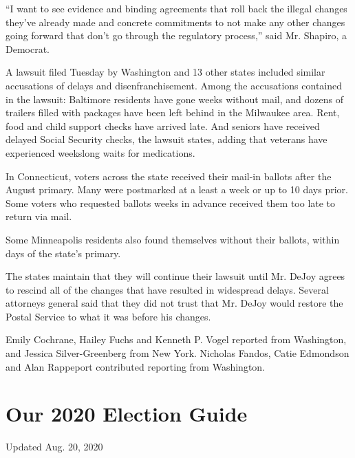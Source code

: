 ``I want to see evidence and binding agreements that roll back the
illegal changes they've already made and concrete commitments to not
make any other changes going forward that don't go through the
regulatory process,'' said Mr. Shapiro, a Democrat.

A lawsuit filed Tuesday by Washington and 13 other states included
similar accusations of delays and disenfranchisement. Among the
accusations contained in the lawsuit: Baltimore residents have gone
weeks without mail, and dozens of trailers filled with packages have
been left behind in the Milwaukee area. Rent, food and child support
checks have arrived late. And seniors have received delayed Social
Security checks, the lawsuit states, adding that veterans have
experienced weekslong waits for medications.

In Connecticut, voters across the state received their mail-in ballots
after the August primary. Many were postmarked at a least a week or up
to 10 days prior. Some voters who requested ballots weeks in advance
received them too late to return via mail.

Some Minneapolis residents also found themselves without their ballots,
within days of the state's primary.

The states maintain that they will continue their lawsuit until Mr.
DeJoy agrees to rescind all of the changes that have resulted in
widespread delays. Several attorneys general said that they did not
trust that Mr. DeJoy would restore the Postal Service to what it was
before his changes.

Emily Cochrane, Hailey Fuchs and Kenneth P. Vogel reported from
Washington, and Jessica Silver-Greenberg from New York. Nicholas Fandos,
Catie Edmondson and Alan Rappeport contributed reporting from
Washington.

\hypertarget{our-2020-election-guide}{%
\section{Our 2020 Election Guide}\label{our-2020-election-guide}}

Updated Aug. 20, 2020

